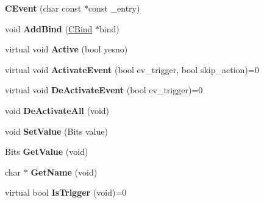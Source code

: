 \begin{DoxyCompactItemize}
\item 
\hypertarget{classCEvent_a2bce0859850093fecded7a9e0e221734}{{\bfseries C\-Event} (char const $\ast$const \-\_\-entry)}\label{classCEvent_a2bce0859850093fecded7a9e0e221734}

\item 
\hypertarget{classCEvent_a2665ebd0551c2b437b02d521f1c7adda}{void {\bfseries Add\-Bind} (\hyperlink{classCBind}{C\-Bind} $\ast$bind)}\label{classCEvent_a2665ebd0551c2b437b02d521f1c7adda}

\item 
\hypertarget{classCEvent_a8643a8541e23ed77a63869dd11780c83}{virtual void {\bfseries Active} (bool yesno)}\label{classCEvent_a8643a8541e23ed77a63869dd11780c83}

\item 
\hypertarget{classCEvent_a1b7abcd9c0ecedc29de42017e3cfef13}{virtual void {\bfseries Activate\-Event} (bool ev\-\_\-trigger, bool skip\-\_\-action)=0}\label{classCEvent_a1b7abcd9c0ecedc29de42017e3cfef13}

\item 
\hypertarget{classCEvent_a525574fb193f9e50402a8fd5028b9b06}{virtual void {\bfseries De\-Activate\-Event} (bool ev\-\_\-trigger)=0}\label{classCEvent_a525574fb193f9e50402a8fd5028b9b06}

\item 
\hypertarget{classCEvent_a633d83fd6d210a7b6a517754548eee11}{void {\bfseries De\-Activate\-All} (void)}\label{classCEvent_a633d83fd6d210a7b6a517754548eee11}

\item 
\hypertarget{classCEvent_aaa253031798af461119b830d079e8225}{void {\bfseries Set\-Value} (Bits value)}\label{classCEvent_aaa253031798af461119b830d079e8225}

\item 
\hypertarget{classCEvent_ad4e49c2aa32efecdc91c9439e858b940}{Bits {\bfseries Get\-Value} (void)}\label{classCEvent_ad4e49c2aa32efecdc91c9439e858b940}

\item 
\hypertarget{classCEvent_a4693b4e54c079cc97f0522eb15154953}{char $\ast$ {\bfseries Get\-Name} (void)}\label{classCEvent_a4693b4e54c079cc97f0522eb15154953}

\item 
\hypertarget{classCEvent_affd064f43309b5fc4966edb36935723d}{virtual bool {\bfseries Is\-Trigger} (void)=0}\label{classCEvent_affd064f43309b5fc4966edb36935723d}

\end{DoxyCompactItemize}
